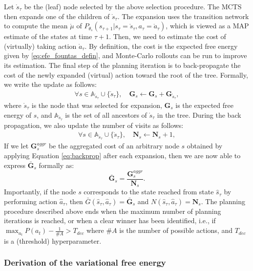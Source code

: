 \documentclass[twoside,11pt]{article}
\begin{document}
Let $\mathring{s}_\tau$ be the (leaf) node selected by the above selection procedure. The MCTS then expands one of the children of $\mathring{s}_\tau$. The expansion uses the transition network to compute the mean $\mathring{\mu}$ of $P_{\theta_s}(s_{\tau+1}|s_\tau=\mathring{s}_\tau, a_\tau=\mathring{a}_\tau)$, which is viewed as a MAP estimate of the states at time $\tau+1$. Then, we need to estimate the cost of (virtually) taking action $\mathring{a}_\tau$. By definition, the cost is the expected free energy given by \eqref{eq:efe_fountas_defin}, and Monte-Carlo rollouts can be run to improve its estimation. The final step of the planning iteration is to back-propagate the cost of the newly expanded (virtual) action toward the root of the tree. Formally, we write the update as follows:
\begin{align}\label{eq:backprop}
\forall s \in \mathbb{A}_{\mathring{s}_\tau} \cup \{\mathring{s}_\tau \}, \quad \bm{G}_{s} \leftarrow \bm{G}_{s} + \bm{G}_{\mathring{s}_\tau},
\end{align}
where $\mathring{s}_\tau$ is the node that was selected for expansion, $\bm{G}_{s}$ is the expected free energy of $s$, and $\mathbb{A}_{\mathring{s}_\tau}$ is the set of all ancestors of $\mathring{s}_\tau$ in the tree. During the back propagation, we also update the number of visits as follows:
\begin{align}\label{eq:backprop_n}
\forall s \in \mathbb{A}_{\mathring{s}_\tau} \cup \{\mathring{s}_\tau \}, \quad \bm{N}_{s} \leftarrow \bm{N}_{s} + 1,
\end{align}
If we let $\bm{G}^{aggr}_s$ be the aggregated cost of an arbitrary node $s$ obtained by applying Equation \ref{eq:backprop} after each expansion, then we are now able to express $\bar{\bm{G}}_s$ formally as:
$$\bar{\bm{G}}_s = \frac{\bm{G}^{aggr}_s}{\bm{N}_s}.$$
Importantly, if the node $s$ corresponds to the state reached from state $\hat{s}_\tau$ by performing action $\hat{a}_\tau$, then $\bar{G}(\hat{s}_\tau, \hat{a}_\tau) = \bar{\bm{G}}_s$ and $N(\hat{s}_\tau, \hat{a}_\tau) = \bm{N}_s$. The planning procedure described above ends when the maximum number of planning iterations is reached, or when a clear winner has been identified, i.e., if $\max_{a_t} P(a_t)-\frac{1}{\#A}>T_{dec}$ where $\#A$ is the number of possible actions, and $T_{dec}$ is a (threshold) hyperparameter.

\subsubsection{Derivation of the variational free energy}\label{ssec:derive_vfe_in_fountas}
\end{document}
